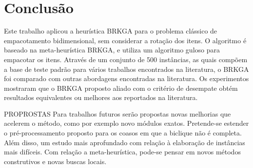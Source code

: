 \documentclass[article]{rian_article}
\begin{document}
\section{Conclusão}
Este trabalho aplicou a heurística BRKGA para o problema clássico de empacotamento bidimensional, sem considerar a rotação dos itens. O algoritmo é baseado na meta-heurística BRKGA, e utiliza um algoritmo guloso para empacotar os itens. Através de um conjunto de 500 instâncias, as quais compõem a base de teste padrão para vários trabalhos encontrados na literatura, o BRKGA foi comparado com outras abordagens encontradas na literatura. Os experimentos mostraram que o BRKGA proposto aliado com o critério de desempate obtém resultados equivalentes ou melhores aos reportados na literatura.

PROPROSTAS
Para trabalhos futuros serão propostas novas melhorias que acelerem o método, como por exemplo novo módulos exatos.
Pretende-se estender o pré-processamento proposto para os coasos em que a biclique não é completa.
Além disso, um estudo mais aprofundado com relação à elaboração de instâncias mais difíceis.
Com relação a meta-heurística, pode-se pensar em novos métodos construtivos e novas buscas locais.



\end{document}
